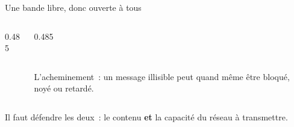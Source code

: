 \begin{frame}{Une bande libre, donc ouverte à tous}
\begin{columns}[T]
\begin{column}{0.485\textwidth}
    \end{column}
    \begin{column}{0.485\textwidth}
      \begin{carte}[height=1.3cm,valign=top,colback=white,colframe=insarouge,boxrule=0.7pt]
        \raggedright{}\\[1pt]
        {\footnotesize L'acheminement~: un message illisible peut quand même être bloqué, noyé ou retardé.\par}
      \end{carte}
    \end{column}
  \end{columns}
  \vspace{0.12cm}
  \begin{pcompact}\centering\footnotesize
    Il faut défendre les deux~: le contenu \textbf{et} la capacité du réseau à transmettre.
  \end{pcompact}
\end{frame}

